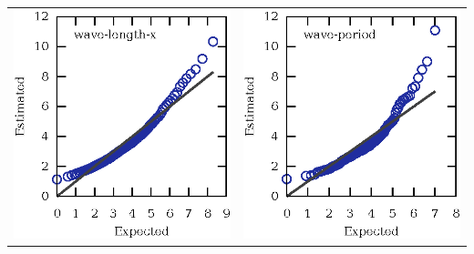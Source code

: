 \documentclass[14pt,aspectratio=169]{beamer}
\begin{document}
\begin{frame}
\begin{columns}
\begin{column}{0.5\textwidth}
\begin{tabular}{ll}
					\addlinespace
					\includegraphics[scale=0.5]{standing-wave-length-x} &
					\includegraphics[scale=0.5]{standing-wave-period} \\
				\end{tabular}
			\end{column}

\end{columns}
\end{frame}
\end{document}
